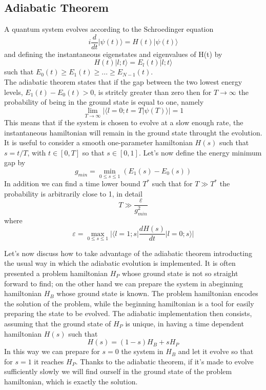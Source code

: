 \documentclass[aps,pra,reprint, onecolumn]{revtex4-2}
\begin{document}
\subsection{Adiabatic Theorem}
A quantum system evolves according to the Schroedinger equation
\begin{equation}
	i\frac{d}{dt}|\psi(t)\rangle = H(t)|\psi(t)\rangle
\end{equation}
and defining the instantaneous eigenstates and eigenvalues of H(t) by
\begin{equation}
	H(t)|l;t\rangle = E_l(t)|l;t\rangle
\end{equation}
such that $E_0(t) \geq E_1(t) \geq ... \geq E_{N-1}(t)$. \\
The adiabatic theorem states that if the gap between the two lowest energy levels, $E_{1}(t) - E_{0}(t) > 0$, is stritcly greater than zero then for $T\rightarrow \infty$ the probability of being in the ground state is equal to one, namely
\begin{equation}
	\lim_{T \to \infty} |\langle l=0;t = T | \psi(T)\rangle| = 1
\end{equation}
This means that if the system is chosen to evolve at a slow enough rate, the instantaneous hamiltonian will remain in the ground state throught the evolution. It is useful to consider a smooth one-parameter hamiltonian $H(s)$ such that $s=t/T$, with $t \in [0,T]$ so that $s \in [0,1]$.
Let's now define the energy minimum gap by
\begin{equation}
	g_{min} = \min_{0 \leq s \leq 1} (E_1(s)-E_0(s))
\end{equation}
In addition we can find a time lower bound $T^*$ such that for $T\gg T^{*}$ the probability is arbitrarily close to 1, in detail
\begin{equation}
	T \gg \frac{\varepsilon}{g^{2}_{min}}
\end{equation}
where
\begin{equation}
	\varepsilon = \max_{0 \leq s \leq 1} \Big| \Big\langle l=1;s\Big| \frac{dH(s)}{dt} \Big| l=0;s\Big\rangle\Big|
\end{equation}


Let's now discuss how to take advantage of the adiabatic theorem introducting the usual way in which the adiabatic evolution is implemented. It is often presented a problem hamiltonian $H_P$ whose ground state is not so straight forward to find; on the other hand we can prepare the system in abeginning hamiltonian $H_B$ whose ground state is known. The problem hamiltonian encodes the solution of the problem, while the beginning hamiltonian is a tool for easily preparing the state to be evolved. The adiabatic implementation then consists, assuming that the ground state of $H_P$ is unique, in having a time dependent hamiltonian $H(s)$ such that
\begin{equation}
	H(s) = (1-s)H_B + s H_P
\end{equation}
In this way we can prepare for $s=0$ the system in $H_B$ and let it evolve so that for $s=1$ it reaches $H_P$. Thanks to the adiabatic theorem, if it's made to evolve sufficiently slowly we will find ourself in the ground state of the problem hamiltonian, which is exactly the solution.
\end{document}
